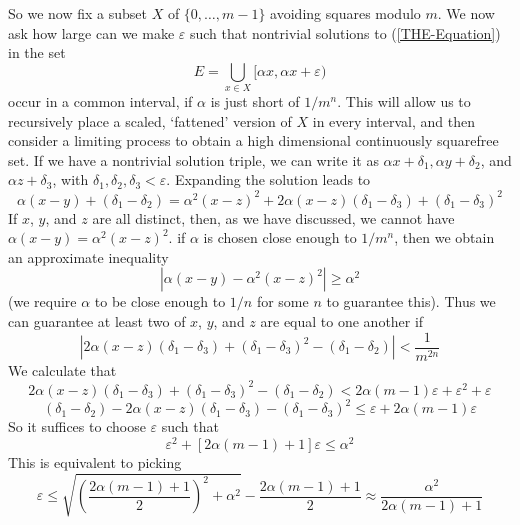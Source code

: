 \documentclass{article}
\theoremstyle{plain}
\theoremstyle{plain}
\begin{document}
So we now fix a subset $X$ of $\{ 0, \dots, m-1 \}$ avoiding squares modulo $m$. We now ask how large can we make $\varepsilon$ such that nontrivial solutions to (\ref{THE-Equation}) in the set
%
\[ E = \bigcup_{x \in X} [\alpha x, \alpha x + \varepsilon) \]
%
occur in a common interval, if $\alpha$ is just short of $1/m^n$. This will allow us to recursively place a scaled, `fattened' version of $X$ in every interval, and then consider a limiting process to obtain a high dimensional continuously squarefree set. If we have a nontrivial solution triple, we can write it as $\alpha x + \delta_1, \alpha y + \delta_2$, and $\alpha z + \delta_3$, with $\delta_1, \delta_2, \delta_3 < \varepsilon$. Expanding the solution leads to
%
\[ \alpha (x - y) + (\delta_1 - \delta_2) = \alpha^2 (x - z)^2 + 2\alpha(x - z)(\delta_1 - \delta_3) + (\delta_1 - \delta_3)^2 \]
%
If $x$, $y$, and $z$ are all distinct, then, as we have discussed, we cannot have $\alpha (x - y) = \alpha^2 (x - z)^2$. if $\alpha$ is chosen close enough to $1/m^n$, then we obtain an approximate inequality
%
\[ |\alpha (x - y) - \alpha^2 (x - z)^2| \geq \alpha^2 \]
%
(we require $\alpha$ to be close enough to $1/n$ for some $n$ to guarantee this). Thus we can guarantee at least two of $x$, $y$, and $z$ are equal to one another if
%
\[ |2\alpha(x - z)(\delta_1 - \delta_3) + (\delta_1 - \delta_3)^2 - (\delta_1 - \delta_2)| < \frac{1}{m^{2n}} \]
%
We calculate that
%
\[ 2\alpha(x - z)(\delta_1 - \delta_3) + (\delta_1 - \delta_3)^2 - (\delta_1 - \delta_2) < 2\alpha(m-1)\varepsilon + \varepsilon^2 + \varepsilon \]
\[ (\delta_1 - \delta_2) - 2\alpha(x - z)(\delta_1 - \delta_3) - (\delta_1 - \delta_3)^2 \leq \varepsilon + 2\alpha(m-1)\varepsilon \]
%
So it suffices to choose $\varepsilon$ such that
%
\[ \varepsilon^2 + [2\alpha(m-1) + 1]\varepsilon \leq \alpha^2 \]
%
This is equivalent to picking
%
\[ \varepsilon \leq \sqrt{\left( \frac{2 \alpha(m - 1) + 1}{2} \right)^2 + \alpha^2} - \frac{2\alpha(m-1) + 1}{2} \approx \frac{\alpha^2}{2\alpha(m-1) + 1} \]
\end{document}

